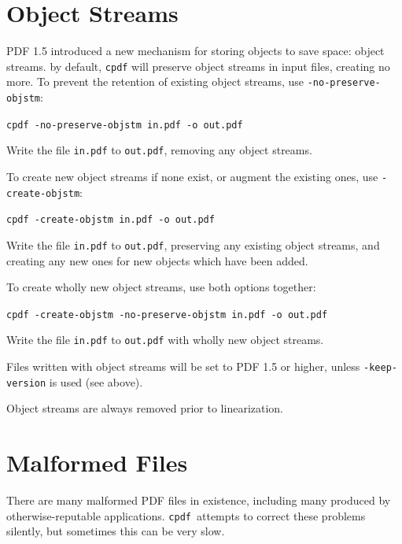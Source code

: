 \documentclass[a4paper,makeidx]{memoir}
\newcommand{\cpdf}{\texttt{cpdf}}
\begin{document}
\section{Object Streams}
PDF 1.5 introduced a new mechanism for storing objects to save space: object streams. by default, \texttt{cpdf} will preserve object streams in input files, creating no more. To prevent the retention of existing object streams, use \texttt{-no-preserve-objstm}:

\begin{framed}
\small\verb!cpdf -no-preserve-objstm in.pdf -o out.pdf!

\vspace{2.5mm}
\noindent Write the file \texttt{in.pdf} to \texttt{out.pdf}, removing any object streams.
\end{framed}

\noindent To create new object streams if none exist, or augment the existing ones, use \texttt{-create-objstm}:

\begin{framed}
\small\verb!cpdf -create-objstm in.pdf -o out.pdf!

\vspace{2.5mm}
\noindent Write the file \texttt{in.pdf} to \texttt{out.pdf}, preserving any existing object streams, and creating any new ones for new objects which have been added.
\end{framed}

\noindent To create wholly new object streams, use both options together:

\begin{framed}
\small\verb!cpdf -create-objstm -no-preserve-objstm in.pdf -o out.pdf!

\vspace{2.5mm}
\noindent Write the file \texttt{in.pdf} to \texttt{out.pdf} with wholly new object streams.
\end{framed}

\noindent Files written with object streams will be set to PDF 1.5 or higher, unless \texttt{-keep-version} is used (see above).

Object streams are always removed prior to linearization.

\section{Malformed Files}

There are many malformed PDF files in existence, including many produced by
otherwise-reputable applications. \cpdf\ attempts to correct these problems
silently, but sometimes this can be very slow.
\end{document}
